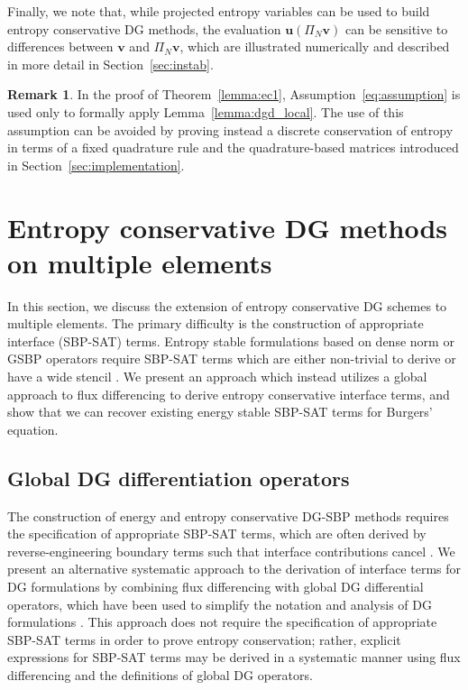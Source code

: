 \documentclass[preprint,10pt]{elsarticle}
\theoremstyle{definition}
\theoremstyle{lemma}
\newtheorem*{remark}{Remark}
\theoremstyle{theorem}
\theoremstyle{assumption}
\newcommand{\LRp}[1]{\left( #1 \right)}
\begin{document}
Finally, we note that, while projected entropy variables can be used to build entropy conservative DG methods, the evaluation $\bm{u}\LRp{\Pi_N \bm{v}}$ can be sensitive to differences between $\bm{v}$ and $\Pi_N \bm{v}$, which are illustrated numerically and described in more detail in Section~\ref{sec:instab}.  

\begin{remark}
In the proof of Theorem~\ref{lemma:ec1}, Assumption~\ref{eq:assumption} is used only to formally apply Lemma~\ref{lemma:dgd_local}.  The use of this assumption can be avoided by proving instead a discrete conservation of entropy in terms of a fixed quadrature rule and the quadrature-based matrices introduced in Section~\ref{sec:implementation}.  
\end{remark}

\section{Entropy conservative DG methods on multiple elements}
\label{sec:ecdg2}

In this section, we discuss the extension of entropy conservative DG schemes to multiple elements.  The primary difficulty is the construction of appropriate interface (SBP-SAT) terms.  Entropy stable formulations based on dense norm or GSBP operators require SBP-SAT terms which are either non-trivial to derive or have a wide stencil \cite{fernandez2016simultaneous, ranocha2017extended}.  We present an approach which instead utilizes a global approach to flux differencing to derive entropy conservative interface terms, and show that we can recover existing energy stable SBP-SAT terms for Burgers' equation.  

\subsection{Global DG differentiation operators}

The construction of energy and entropy conservative DG-SBP methods requires the specification of appropriate SBP-SAT terms, which are often derived by reverse-engineering  boundary terms such that interface contributions cancel \cite{fernandez2016simultaneous, ranocha2017comparison, ranocha2017extended}.  We present an alternative systematic approach to the derivation of interface terms for DG formulations by combining flux differencing with global DG differential operators, which have been used to simplify the notation and analysis of DG formulations \cite{hesthaven2004high, di2011mathematical, wang2013weak}.  This approach does not require the specification of appropriate SBP-SAT terms in order to prove entropy conservation; rather, explicit expressions for SBP-SAT terms may be derived in a systematic manner using flux differencing and the definitions of global DG operators.  
\end{document}
